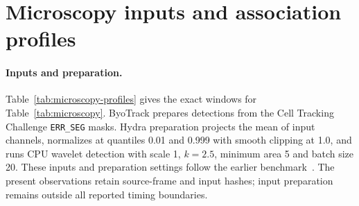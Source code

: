 \documentclass[11pt,a4paper]{article}
\begin{document}
\begin{table}[!htbp]
\centering
\caption{Frozen application workload inventory. Frames, captured matrices and source identities describe the supplied corpus, not a wider tracking population.}
\label{tab:appworkload}
\begingroup\small
\setlength{\tabcolsep}{3pt}
\renewcommand{\arraystretch}{1.12}

\endgroup
\end{table}

\begin{table}[!htbp]
\centering
\caption{Supplied-box tracking validation and metric differences relative to SciPy. Percentage-point changes, switch counts and prediction differences are distinct from replay objective agreement. All retained differences are descriptive and do not establish a general accuracy benefit. Native denotes JVRUST/JVHYBRID/JVCPP; C/S denote Centroid/SORT, M16/M20 the two clips, GT/RF the detection source. The metric vectors and prediction identities agree across environments, so these identical results are printed once.}
\label{tab:accuracy}
\begingroup\footnotesize
\setlength{\tabcolsep}{3pt}
\renewcommand{\arraystretch}{1.12}

\endgroup
\end{table}

\FloatBarrier
\section{Microscopy inputs and association profiles}\label{app:microscopy}

\begin{table}[!htbp]
\centering
\caption{Microscopy association profiles from one separate instrumented run per configuration. Source frame ranges are inclusive and zero-based. The largest stock-input matrix is selected by area before Pylapy's cost expansion.}
\label{tab:microscopy-profiles}

\end{table}

\paragraph{Inputs and preparation.}
Table~\ref{tab:microscopy-profiles} gives the exact windows for Table~\ref{tab:microscopy}. ByoTrack prepares detections from the Cell Tracking Challenge \texttt{ERR\_SEG} masks. Hydra preparation projects the mean of input channels, normalizes at quantiles 0.01 and 0.999 with smooth clipping at 1.0, and runs CPU wavelet detection with scale 1, $k=2.5$, minimum area 5 and batch size 20. These inputs and preparation settings follow the earlier benchmark~\cite{reme2026cellbenchmark}. The present observations retain source-frame and input hashes; input preparation remains outside all reported timing boundaries.
\end{document}
